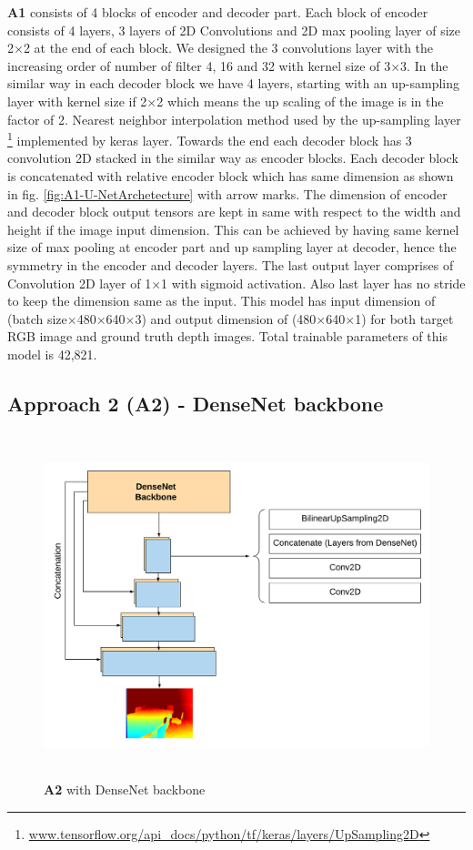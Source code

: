 \textbf{A1} consists of 4 blocks of encoder and decoder part. Each block of encoder consists of 4 layers, 3 layers of 2D Convolutions and 2D max pooling layer of size 2$\times$2 at the end of each block. We designed the 3 convolutions layer with the increasing order of number of filter 4, 16 and 32 with kernel size of 3$\times$3. In the similar way in each decoder block we have 4 layers, starting with an up-sampling layer with kernel size if 2$\times$2 which means the up scaling of the image is in the factor of 2. Nearest neighbor interpolation method used by the up-sampling layer \footnote{\url{www.tensorflow.org/api_docs/python/tf/keras/layers/UpSampling2D}} implemented by keras layer. Towards the end each decoder block has 3 convolution 2D stacked in the similar way as encoder blocks. Each decoder block is concatenated with relative encoder block which has same dimension as shown in fig. \ref{fig:A1-U-NetArchetecture} with arrow marks. The dimension of encoder and decoder block output tensors are kept in same with respect to the width and height if the image input dimension. This can be achieved by having same kernel size of max pooling at encoder part and up sampling layer at decoder, hence the symmetry in the encoder and decoder layers. The last output layer comprises of Convolution 2D layer of 1$\times$1 with sigmoid activation. Also last layer has no stride to keep the dimension same as the input. 
This model has input dimension of (batch size$\times$480$\times$640$\times$3) and output dimension of (480$\times$640$\times$1) for both target RGB image and ground truth depth images. Total trainable parameters of this model is 42,821.



\subsection{Approach 2 (A2) - DenseNet backbone}

\begin{figure}[h]
    \centering
    \includegraphics[width = 15cm,  height = 10cm]{Figures/A2.png}
    \caption{\textbf{A2} with DenseNet backbone}
    \label{fig:A2-DenseNet-arch}
\end{figure}{}




